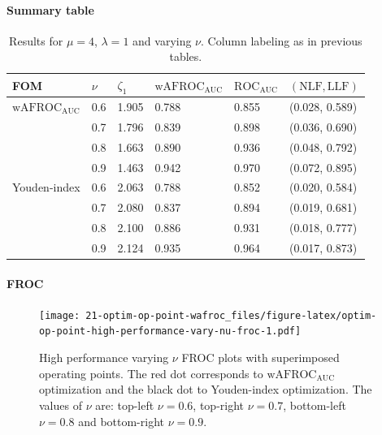 \documentclass[
]{book}
\begin{document}
\hypertarget{summary-table-8}{%
\paragraph{Summary table}\label{summary-table-8}}

\begin{table}

\caption{\label{tab:optim-op-point-high-performance-vary-nu-table}Results for $\mu = 4$, $\lambda = 1$ and varying $\nu$. Column labeling as in previous tables.}
\centering
\fontsize{10}{12}\selectfont
\begin{tabular}[t]{llllll}
\toprule
FOM & $\nu$ & $\zeta_1$ & $\text{wAFROC}_\text{AUC}$ & $\text{ROC}_\text{AUC}$ & $\left( \text{NLF}, \text{LLF}\right)$\\
\midrule
$\text{wAFROC}_\text{AUC}$ & 0.6 & 1.905 & 0.788 & 0.855 & (0.028, 0.589)\\
 & 0.7 & 1.796 & 0.839 & 0.898 & (0.036, 0.690)\\
 & 0.8 & 1.663 & 0.890 & 0.936 & (0.048, 0.792)\\
 & 0.9 & 1.463 & 0.942 & 0.970 & (0.072, 0.895)\\
Youden-index & 0.6 & 2.063 & 0.788 & 0.852 & (0.020, 0.584)\\
\addlinespace
 & 0.7 & 2.080 & 0.837 & 0.894 & (0.019, 0.681)\\
 & 0.8 & 2.100 & 0.886 & 0.931 & (0.018, 0.777)\\
 & 0.9 & 2.124 & 0.935 & 0.964 & (0.017, 0.873)\\
\bottomrule
\end{tabular}
\end{table}

\hypertarget{froc-9}{%
\paragraph{FROC}\label{froc-9}}

\begin{figure}
\centering
\texttt{[image: 21-optim-op-point-wafroc\_files/figure-latex/optim-op-point-high-performance-vary-nu-froc-1.pdf]}
\caption{\label{fig:optim-op-point-high-performance-vary-nu-froc}High performance varying \(\nu\) FROC plots with superimposed operating points. The red dot corresponds to \(\text{wAFROC}_\text{AUC}\) optimization and the black dot to Youden-index optimization. The values of \(\nu\) are: top-left \(\nu = 0.6\), top-right \(\nu = 0.7\), bottom-left \(\nu = 0.8\) and bottom-right \(\nu = 0.9\).}
\end{figure}
\end{document}
